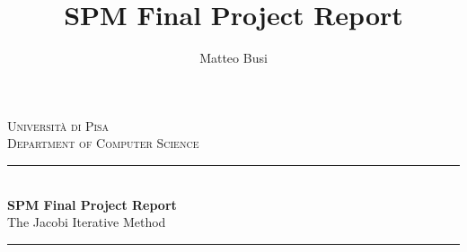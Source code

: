 \documentclass[12pt, oneside, a4paper]{article}
\author{Matteo Busi}
\title{SPM Final Project Report}
\newcommand{\HRule}{\rule{\linewidth}{0.5mm}} %
\begin{document}
	
	\begin{titlepage}
				
		\center %
		
		
		\textsc{\LARGE Universit\`a di Pisa}\\[1.5cm] %
		\textsc{\Large Department of Computer Science}\\[1.5cm] %
		
		
		\HRule \\[1cm]
		{ \huge \bfseries SPM Final Project Report}\\[0.4cm] %
		{ \Large The Jacobi Iterative Method }\\[0.4cm]
		\HRule \\[1.5cm]
		
		
		

\end{titlepage}
\end{document}
